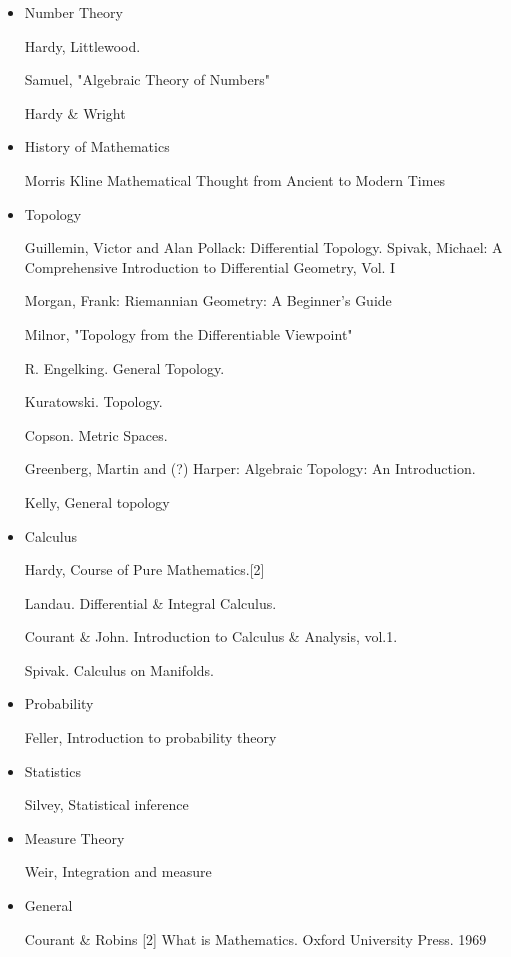 \begin{itemize}
\item Number Theory

Hardy, Littlewood.

Samuel, "Algebraic Theory of Numbers"


Hardy \& Wright

\item History of Mathematics

Morris Kline Mathematical Thought from Ancient to Modern Times

\item Topology

Guillemin, Victor and Alan Pollack: Differential Topology.
Spivak, Michael: A Comprehensive Introduction to Differential Geometry, Vol. I

Morgan, Frank: Riemannian Geometry: A Beginner's Guide

Milnor, "Topology from the Differentiable Viewpoint"

 R. Engelking. General Topology.

  Kuratowski. Topology.

  Copson. Metric Spaces.



Greenberg, Martin and (?) Harper: Algebraic Topology: An Introduction.

Kelly, General topology

\item Calculus

Hardy, Course of Pure Mathematics.[2]

Landau. Differential \& Integral Calculus.

  Courant \& John. Introduction to Calculus \& Analysis, vol.1.

  Spivak. Calculus on Manifolds.


\item Probability

Feller, Introduction to probability theory

\item Statistics

Silvey, Statistical inference

\item Measure Theory

Weir, Integration and measure


\item General

Courant \& Robins [2]
What is Mathematics.
Oxford University Press.
1969


\end{itemize}

